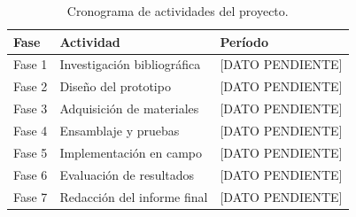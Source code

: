 \begin{table}[htbp]
    \centering
    \caption{Cronograma de actividades del proyecto.}
    \label{tab:cronograma}
    \begin{tabular}{lll}
        \toprule
        \textbf{Fase} & \textbf{Actividad} & \textbf{Período} \\
        \midrule
        Fase 1 & Investigación bibliográfica    & [DATO PENDIENTE] \\
        Fase 2 & Diseño del prototipo           & [DATO PENDIENTE] \\
        Fase 3 & Adquisición de materiales      & [DATO PENDIENTE] \\
        Fase 4 & Ensamblaje y pruebas           & [DATO PENDIENTE] \\
        Fase 5 & Implementación en campo        & [DATO PENDIENTE] \\
        Fase 6 & Evaluación de resultados       & [DATO PENDIENTE] \\
        Fase 7 & Redacción del informe final    & [DATO PENDIENTE] \\
        \bottomrule
    \end{tabular}
\end{table}
